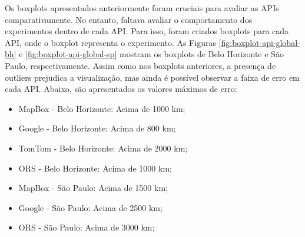 Os boxplots apresentados anteriormente foram cruciais para avaliar as APIs comparativamente. No entanto, faltava avaliar o comportamento dos experimentos dentro de cada API. Para isso, foram criados boxplots para cada API, onde o boxplot representa o experimento. As Figuras \ref{fig:boxplot-api-global-bh} e \ref{fig:boxplot-api-global-sp} mostram os boxplots de Belo Horizonte e São Paulo, respectivamente. Assim como nos boxplots anteriores, a presença de outliers prejudica a visualização, mas ainda é possível observar a faixa de erro em cada API. Abaixo, são apresentados os valores máximos de erro:

\begin{itemize}
  \item MapBox - Belo Horizonte: Acima de 1000 km;
  \item Google - Belo Horizonte: Acima de 800 km;
  \item TomTom - Belo Horizonte: Acima de 2000 km;
  \item ORS - Belo Horizonte: Acima de 1000 km;
  \item MapBox - São Paulo: Acima de 1500 km;
  \item Google - São Paulo: Acima de 2500 km;
  \item ORS - São Paulo: Acima de 3000 km;
\end{itemize} 


